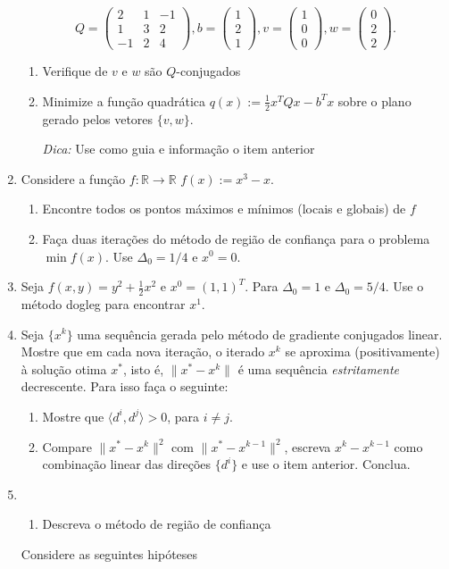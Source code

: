 \documentclass[a4paper,latin]{article}
\begin{document}
\begin{enumerate}
    $$
    Q=\begin{pmatrix}
    2 & 1 & -1 \\
    1 & 3 &  2 \\
    -1 & 2 & 4
    \end{pmatrix},  
    b=\begin{pmatrix}
    1 \\
    2 \\
    1
    \end{pmatrix}, 
    v=\begin{pmatrix}
    1 \\
    0 \\
    0
    \end{pmatrix}, 
    w=\begin{pmatrix}
    0 \\
    2 \\
    2
    \end{pmatrix}.$$
     \begin{enumerate}
     	\item Verifique de $v$ e $w$ são $Q$-conjugados
     	\item Minimize a função quadrática 
     	$q(x):=\frac{1}{2} x^{T}Qx-b^{T}x$ sobre o plano gerado pelos vetores $\{v,w\}$.
     	
     	{\it Dica: } Use como guia e informação o item anterior
     \end{enumerate}
    \item Considere a função $f:\mathbb{R} \rightarrow \mathbb{R}$
    $f(x):=x^{3}-x$. 
       \begin{enumerate}
       	\item Encontre todos os pontos máximos e mínimos (locais e globais) de $f$
       	\item Faça duas iterações do método de região de confiança para  o problema $\min f(x)$. Use $\Delta_{0}=1/4$ e $x^{0}=0$.
       \end{enumerate}
     \item Seja $f(x,y)=y^2+\frac{1}{2}x^2$ e $x^0=(1,1)^{T}$.
     Para $\Delta_0=1$ e $\Delta_0=5/4$. Use o método dogleg para encontrar $x^1$. 
    \item Seja $\{x^{k}\}$ uma sequência gerada pelo método de gradiente conjugados linear. Mostre que em cada nova iteração, o 
    iterado $x^{k}$ se aproxima (positivamente) à solução otima $x^{*}$, isto é, 
    $\|x^*-x^{k}\|$ é uma sequência {\it estritamente} decrescente.
    Para isso faça o seguinte:
      \begin{enumerate}
    	\item Mostre que $\langle d^{i}, d^{j}\rangle>0$, para 
    	$i \neq j$. 
    	\item Compare $\|x^*-x^{k}\|^{2}$ com $\|x^*-x^{k-1}\|^{2}$, 
    	escreva $x^{k}-x^{k-1}$ como combinação linear das direções $\{d^{i}\}$ e use o item anterior.  Conclua.   	
      \end{enumerate}	 
    \item \begin{enumerate}
    	  \item Descreva o método de região de confiança
    	  \end{enumerate}
      Considere as seguintes hipóteses
      

\end{enumerate}
\end{document}
